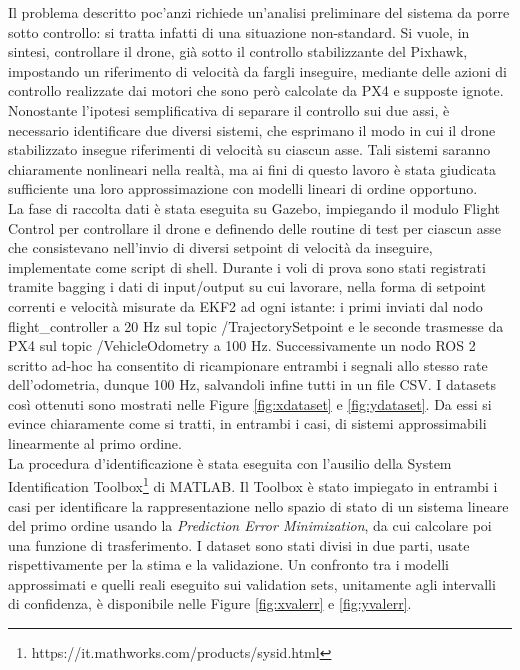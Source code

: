 \indent Il problema descritto poc'anzi richiede un'analisi preliminare del sistema da porre sotto controllo: si tratta infatti di una situazione non-standard. Si vuole, in sintesi, controllare il drone, già sotto il controllo stabilizzante del Pixhawk, impostando un riferimento di velocità da fargli inseguire, mediante delle azioni di controllo realizzate dai motori che sono però calcolate da PX4 e supposte ignote. Nonostante l'ipotesi semplificativa di separare il controllo sui due assi, è necessario identificare due diversi sistemi, che esprimano il modo in cui il drone stabilizzato insegue riferimenti di velocità su ciascun asse. Tali sistemi saranno chiaramente nonlineari nella realtà, ma ai fini di questo lavoro è stata giudicata sufficiente una loro approssimazione con modelli lineari di ordine opportuno.\\
La fase di raccolta dati è stata eseguita su Gazebo, impiegando il modulo Flight Control per controllare il drone e definendo delle routine di test per ciascun asse che consistevano nell'invio di diversi setpoint di velocità da inseguire, implementate come script di shell. Durante i voli di prova sono stati registrati tramite bagging i dati di input/output su cui lavorare, nella forma di setpoint correnti e velocità misurate da EKF2 ad ogni istante: i primi inviati dal nodo flight\_controller a 20 Hz sul topic /TrajectorySetpoint e le seconde trasmesse da PX4 sul topic /VehicleOdometry a 100 Hz. Successivamente un nodo ROS 2 scritto ad-hoc ha consentito di ricampionare entrambi i segnali allo stesso rate dell'odometria, dunque 100 Hz, salvandoli infine tutti in un file CSV. I datasets così ottenuti sono mostrati nelle Figure \ref{fig:xdataset} e \ref{fig:ydataset}. Da essi si evince chiaramente come si tratti, in entrambi i casi, di sistemi approssimabili linearmente al primo ordine.\\
La procedura d'identificazione è stata eseguita con l'ausilio della System Identification Toolbox\footnote{https://it.mathworks.com/products/sysid.html} di MATLAB. Il Toolbox è stato impiegato in entrambi i casi per identificare la rappresentazione nello spazio di stato di un sistema lineare del primo ordine usando la \emph{Prediction Error Minimization}, da cui calcolare poi una funzione di trasferimento. I dataset sono stati divisi in due parti, usate rispettivamente per la stima e la validazione. Un confronto tra i modelli approssimati e quelli reali eseguito sui validation sets, unitamente agli intervalli di confidenza, è disponibile nelle Figure \ref{fig:xvalerr} e \ref{fig:yvalerr}.

